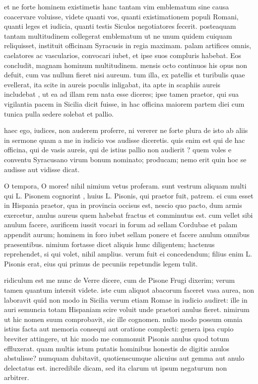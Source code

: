  et ne forte hominem existimetis hanc tantam vim emblematum sine causa coacervare voluisse, videte quanti vos, quanti existimationem populi Romani, quanti leges et iudicia, quanti testis Siculos negotiatores fecerit. posteaquam tantam multitudinem collegerat emblematum ut ne unum quidem cuiquam reliquisset, instituit officinam Syracusis in regia maximam. palam artifices omnis, caelatores ac vascularios, convocari iubet, et ipse suos compluris habebat. Eos concludit, magnam hominum multitudinem. mensis octo continuos his opus non defuit, cum vas nullum fieret nisi aureum. tum illa, ex patellis et turibulis quae evellerat, ita scite in aureis poculis inligabat, ita apte in scaphiis aureis includebat , ut ea ad illam rem nata esse diceres; ipse tamen praetor, qui sua vigilantia pacem in Sicilia dicit fuisse, in hac officina maiorem partem diei cum tunica pulla sedere solebat et pallio.

 haec ego, iudices, non auderem proferre, ni vererer ne forte plura de isto ab aliis in sermone quam a me in iudicio vos audisse diceretis. quis enim est qui de hac officina, qui de vasis aureis, qui de istius pallio non audierit ? quem voles e conventu Syracusano virum bonum nominato; producam; nemo erit quin hoc se audisse aut vidisse dicat.

 O tempora, O mores! nihil nimium vetus proferam. sunt vestrum aliquam multi qui L. Pisonem cognorint , huius L. Pisonis, qui praetor fuit, patrem. ei cum esset in Hispania praetor, qua in provincia occisus est, nescio quo pacto, dum armis exercetur, anulus aureus quem habebat fractus et comminutus est. cum vellet sibi anulum facere, aurificem iussit vocari in forum ad sellam Cordubae et palam appendit aurum; hominem in foro iubet sellam ponere et facere anulum omnibus praesentibus. nimium fortasse dicet aliquis hunc diligentem; hactenus reprehendet, si qui volet, nihil amplius. verum fuit ei concedendum; filius enim L. Pisonis erat, eius qui primus de pecuniis repetundis legem tulit.

 ridiculum est me nunc de Verre dicere, cum de Pisone Frugi dixerim; verum tamen quantum intersit videte. iste cum aliquot abacorum faceret vasa aurea, non laboravit quid non modo in Sicilia verum etiam Romae in iudicio audiret: ille in auri semuncia totam Hispaniam scire voluit unde praetori anulus fieret. nimirum ut hic nomen suum comprobavit, sic ille cognomen. nullo modo possum omnia istius facta aut memoria consequi aut oratione complecti: genera ipsa cupio breviter attingere, ut hic modo me commonuit Pisonis anulus quod totum effluxerat. quam multis istum putatis hominibus honestis de digitis anulos abstulisse? numquam dubitavit, quotienscumque alicuius aut gemma aut anulo delectatus est. incredibile dicam, sed ita clarum ut ipsum negaturum non arbitrer.

